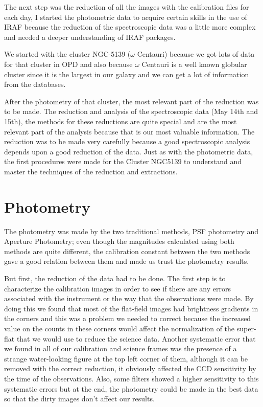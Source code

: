 The next step was the reduction of all the images with the calibration files for each day, I started the photometric data to acquire certain skills in the use of IRAF because the reduction of the spectroscopic data was a little more complex and needed a deeper understanding of IRAF packages. 

We started with the cluster NGC-5139 ($ \omega $ Centauri) because we got lots of data for that cluster in OPD and also because $ \omega $ Centauri is a well known globular cluster since it is the largest in our galaxy and we can get a lot of information from the databases. 

After the photometry of that cluster, the most relevant part of the reduction was to be made. The reduction and analysis of the spectroscopic data (May 14th and 15th), the methods for these reductions are quite special and are the most relevant part of the analysis because that is our most valuable information. The reduction was to be made very carefully because a good spectroscopic analysis depends upon a good reduction of the data. Just as with the photometric data, the first procedures were made for the Cluster NGC5139 to understand and master the techniques of the reduction and extractions.

\section{Photometry}

The photometry was made by the two traditional methods, PSF photometry and Aperture Photometry; even though the magnitudes calculated using both methods are quite different, the calibration constant between the two methods gave a good relation between them and made us trust the photometry results.

But first, the reduction of the data had to be done. The first step is to characterize the calibration images in order to see if there are any errors associated with the instrument or the way that the observations were made. By doing this we found that most of the flat-field images had brightness gradients in the corners and this was a problem we needed to correct because the increased value on the counts in these corners would affect the normalization of the super-flat that we would use to reduce the science data. Another systematic error that we found in all of our calibration and science frames was the presence of a strange water-looking figure at the top left corner of them, although it can be removed with the correct reduction, it obviously affected the CCD sensitivity by the time of the observations. Also, some filters showed a higher sensitivity to this systematic errors but at the end, the photometry could be made in the best data so that the dirty images don't affect our results.

